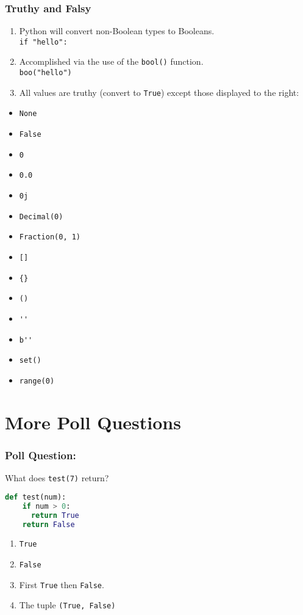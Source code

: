 \documentclass{beamer}
\begin{document}
%
%
\begin{frame}[fragile]
  \frametitle{Truthy and Falsy}
  \begin{minipage}{0.69\textwidth}
    \begin{enumerate}[A]
      \item Python will convert non-Boolean types to Booleans. \\\lstinline|if "hello":|
      \item Accomplished via the use of the \lstinline|bool()| function. \\\lstinline|boo("hello")|
      \item All values are truthy (convert to \lstinline|True|) except those displayed to the right:
    \end{enumerate}
  \end{minipage}
  \begin{minipage}{0.29\textwidth}
    {\scriptsize
    \begin{itemize} 
      \item \lstinline|None|
      \item \lstinline|False|
      \item \lstinline|0|
      \item \lstinline|0.0|
      \item \lstinline|0j|
      \item \lstinline|Decimal(0)|
      \item \lstinline|Fraction(0, 1)|
      \item \lstinline|[]|
      \item \lstinline|{}|
      \item \lstinline|()|
      \item \lstinline|''|
      \item \lstinline|b''|
      \item \lstinline|set()|
      \item \lstinline|range(0)|
  \end{itemize}}
  \end{minipage}
\end{frame}

%
%
\section{More Poll Questions}
\begin{frame}[fragile]
  \frametitle{Poll Question: }
  What does \lstinline|test(7)| return?
  \begin{lstlisting}[language=Python, autogobble]
  def test(num):
    if num > 0:
      return True
    return False
  \end{lstlisting}
  \vfill
  \begin{enumerate}[A]
    \item \lstinline|True|
    \item \lstinline|False|
    \item First \lstinline|True| then \lstinline|False|.
    \item The tuple \lstinline|(True, False)|
  \end{enumerate}
\end{frame}
\end{document}
